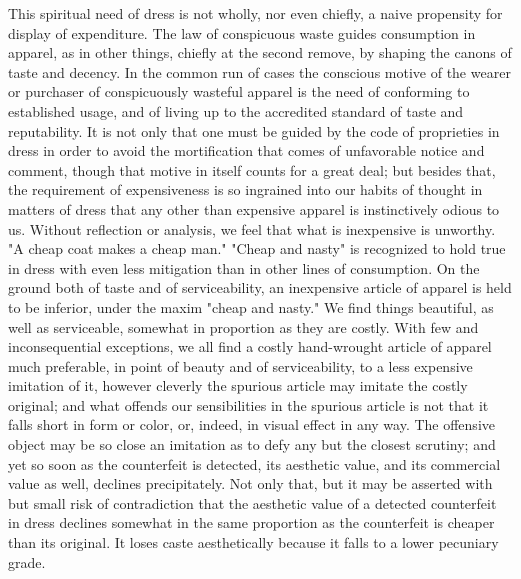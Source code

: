 \documentclass[12pt]{report}
\begin{document}
This spiritual need of dress is not wholly, nor even chiefly, a naive
propensity for display of expenditure. The law of conspicuous waste
guides consumption in apparel, as in other things, chiefly at the second
remove, by shaping the canons of taste and decency. In the common run of
cases the conscious motive of the wearer or purchaser of conspicuously
wasteful apparel is the need of conforming to established usage, and of
living up to the accredited standard of taste and reputability. It is
not only that one must be guided by the code of proprieties in dress in
order to avoid the mortification that comes of unfavorable notice and
comment, though that motive in itself counts for a great deal; but
besides that, the requirement of expensiveness is so ingrained into
our habits of thought in matters of dress that any other than expensive
apparel is instinctively odious to us. Without reflection or analysis,
we feel that what is inexpensive is unworthy. "A cheap coat makes a
cheap man." "Cheap and nasty" is recognized to hold true in dress with
even less mitigation than in other lines of consumption. On the ground
both of taste and of serviceability, an inexpensive article of apparel
is held to be inferior, under the maxim "cheap and nasty." We find
things beautiful, as well as serviceable, somewhat in proportion as
they are costly. With few and inconsequential exceptions, we all find
a costly hand-wrought article of apparel much preferable, in point
of beauty and of serviceability, to a less expensive imitation of it,
however cleverly the spurious article may imitate the costly original;
and what offends our sensibilities in the spurious article is not that
it falls short in form or color, or, indeed, in visual effect in any
way. The offensive object may be so close an imitation as to defy
any but the closest scrutiny; and yet so soon as the counterfeit
is detected, its aesthetic value, and its commercial value as well,
declines precipitately. Not only that, but it may be asserted with
but small risk of contradiction that the aesthetic value of a detected
counterfeit in dress declines somewhat in the same proportion as the
counterfeit is cheaper than its original. It loses caste aesthetically
because it falls to a lower pecuniary grade.
\end{document}
